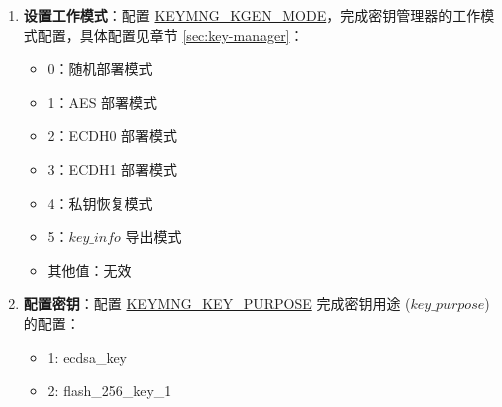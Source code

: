 \documentclass[main\_\_CN.tex]{subfiles}
\begin{document}
\begin{enumerate}
\begin{itemize}
        \item \textbf{\hyperref[fielddesc:EFUSEKMRNDSWITCHCYCLE]{EFUSE\_KM\_RND\_SWITCH\_CYCLE}}：配置密钥管理器切换随机数的周期。注意：此切换周期建议配置为 TRNG 模块的时钟周期所对应的密钥管理器时钟周期数。
        \begin{itemize}
            \item 0：切换周期由 \hyperref[fielddesc:KEYMNGRNDSWITCHCYCLE]{KEYMNG\_RND\_SWITCH\_CYCLE} 控制
            \item 1：8 个密钥管理器时钟周期
            \item 2：16 个密钥管理器时钟周期
            \item 3：32 个密钥管理器时钟周期
        \end{itemize}
        \item \textbf{\hyperref[fielddesc:KEYMNGRNDSWITCHCYCLE]{KEYMNG\_RND\_SWITCH\_CYCLE}}：配置密钥管理器切换随机数的周期，单位为密钥管理器时钟周期。仅当 \hyperref[fielddesc:EFUSEKMRNDSWITCHCYCLE]{EFUSE\_KM\_RND\_SWITCH\_CYCLE} 为 0 时生效。注意：此切换周期建议配置为 TRNG 模块的时钟周期所对应的密钥管理器时钟周期数。
    \end{itemize}
    \item \textbf{设置工作模式}：配置 \hyperref[fielddesc:KEYMNGKGENMODE]{KEYMNG\_KGEN\_MODE}，完成密钥管理器的工作模式配置，具体配置见章节 \ref{sec:key-manager}：
    \begin{itemize}
        \item 0：随机部署模式
        \item 1：AES 部署模式
        \item 2：ECDH0 部署模式
        \item 3：ECDH1 部署模式
        \item 4：私钥恢复模式
        \item 5：\hyperref[para:keyinfo]{\begin{math}key\_info\end{math}} 导出模式
        \item 其他值：无效
    \end{itemize}
    \label{sec:keymng-key-purpose}
    \item \textbf{配置密钥}：配置 \hyperref[fielddesc:KEYMNGKEYPURPOSE]{KEYMNG\_KEY\_PURPOSE} 完成密钥用途 (\begin{math}key\_purpose\end{math}) 的配置：
    \begin{itemize}
        \item 1:  ecdsa\_key
        \item 2:  flash\_256\_key\_1

\end{itemize}
\end{enumerate}
\end{document}
